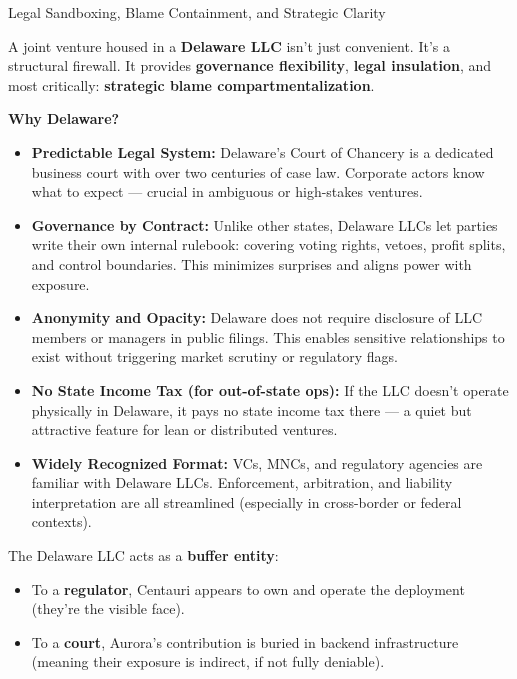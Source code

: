 \begin{TechnicalSidebar}{Legal Sandboxing, Blame Containment, and Strategic Clarity}

  A joint venture housed in a \textbf{Delaware LLC} isn’t just convenient. It’s a structural firewall.  
  It provides \textbf{governance flexibility}, \textbf{legal insulation}, and most critically: \textbf{strategic blame 
  compartmentalization}.
  
  \medskip
  
  \textbf{Why Delaware?}

  \medskip
  
  \begin{itemize}
    \item \textbf{Predictable Legal System:}  
    Delaware’s Court of Chancery is a dedicated business court with over two centuries of case law. Corporate actors 
    know what to expect — crucial in ambiguous or high-stakes ventures.
  
    \item \textbf{Governance by Contract:}  
    Unlike other states, Delaware LLCs let parties write their own internal rulebook: covering voting rights, vetoes, 
    profit splits, and control boundaries. This minimizes surprises and aligns power with exposure.
  
    \item \textbf{Anonymity and Opacity:}  
    Delaware does not require disclosure of LLC members or managers in public filings. This enables sensitive relationships 
    to exist without triggering market scrutiny or regulatory flags.
  
    \item \textbf{No State Income Tax (for out-of-state ops):}  
    If the LLC doesn’t operate physically in Delaware, it pays no state income tax there — a quiet but attractive feature 
    for lean or distributed ventures.
  
    \item \textbf{Widely Recognized Format:}  
    VCs, MNCs, and regulatory agencies are familiar with Delaware LLCs. Enforcement, arbitration, and liability 
    interpretation are all streamlined (especially in cross-border or federal contexts).
  \end{itemize}
  
  \medskip
  
  The Delaware LLC acts as a \textbf{buffer entity}:

  \medskip
  
  \begin{itemize}
    \item To a \textbf{regulator}, Centauri appears to own and operate the deployment (they’re the visible face).
    \item To a \textbf{court}, Aurora’s contribution is buried in backend infrastructure (meaning their exposure 
    is indirect, if not fully deniable).
  \end{itemize}


\end{TechnicalSidebar}

